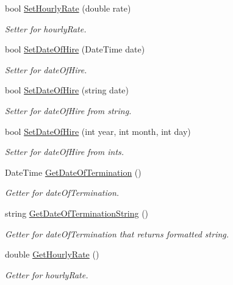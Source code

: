 \begin{DoxyCompactItemize}
bool \hyperlink{class_all_employees_1_1_parttime_employee_aa6d26bed017f4a5fd80b2842c26151bb}{Set\+Hourly\+Rate} (double rate)
\begin{DoxyCompactList}\small\item\em Setter for hourly\+Rate. \end{DoxyCompactList}\item 
bool \hyperlink{class_all_employees_1_1_parttime_employee_aa57cd09d4828cb5628f8b6200cdceeac}{Set\+Date\+Of\+Hire} (Date\+Time date)
\begin{DoxyCompactList}\small\item\em Setter for date\+Of\+Hire. \end{DoxyCompactList}\item 
bool \hyperlink{class_all_employees_1_1_parttime_employee_a7b1681699133e08b3c11900b73d757ef}{Set\+Date\+Of\+Hire} (string date)
\begin{DoxyCompactList}\small\item\em Setter for date\+Of\+Hire from string. \end{DoxyCompactList}\item 
bool \hyperlink{class_all_employees_1_1_parttime_employee_a8f49e4626627f95f098c56f092207a8e}{Set\+Date\+Of\+Hire} (int year, int month, int day)
\begin{DoxyCompactList}\small\item\em Setter for date\+Of\+Hire from ints. \end{DoxyCompactList}\item 
Date\+Time \hyperlink{class_all_employees_1_1_parttime_employee_a58fdbd9bf434cfeba1d3418bf1576100}{Get\+Date\+Of\+Termination} ()
\begin{DoxyCompactList}\small\item\em Getter for date\+Of\+Termination. \end{DoxyCompactList}\item 
string \hyperlink{class_all_employees_1_1_parttime_employee_aece6dee0304f86e5d03cb751bd3cbb49}{Get\+Date\+Of\+Termination\+String} ()
\begin{DoxyCompactList}\small\item\em Getter for date\+Of\+Termination that returns formatted string. \end{DoxyCompactList}\item 
double \hyperlink{class_all_employees_1_1_parttime_employee_a4ba1d87aad959a31b19fa232da9bdd3c}{Get\+Hourly\+Rate} ()
\begin{DoxyCompactList}\small\item\em Getter for hourly\+Rate. \end{DoxyCompactList}\item 

\end{DoxyCompactItemize}
